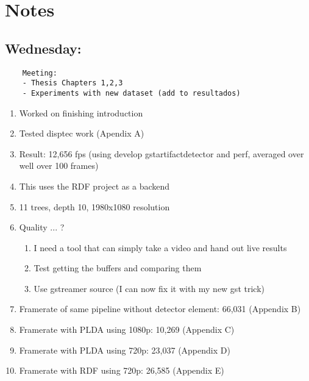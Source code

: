 \documentclass[12pt,oneside]{book}
\begin{document}
  \section*{Notes}
  \setlength\parindent{0pt}

  \subsection*{Wednesday:}
  \begin{lstlisting}
    Meeting:
    - Thesis Chapters 1,2,3
    - Experiments with new dataset (add to resultados)
  \end{lstlisting}

  \begin{enumerate}
    \item Worked on finishing introduction
    \item Tested disptec work (Apendix A)
    \item Result: 12,656 fps (using develop gstartifactdetector and perf, averaged over well over 100 frames)
    \item This uses the RDF project as a backend
    \item 11 trees, depth 10, 1980x1080 resolution
    \item Quality ... ?
    \begin{enumerate}
      \item I need a tool that can simply take a video and hand out live results
      \item Test getting the buffers and comparing them
      \item Use gstreamer source (I can now fix it with my new gst trick)
    \end{enumerate}
    \item Framerate of same pipeline without detector element: 66,031 (Appendix B)
    \item Framerate with PLDA using 1080p: 10,269 (Appendix C)
    \item Framerate with PLDA using  720p: 23,037 (Appendix D)
    \item Framerate with RDF using  720p: 26,585 (Appendix E)
  \end{enumerate}
\end{document}
